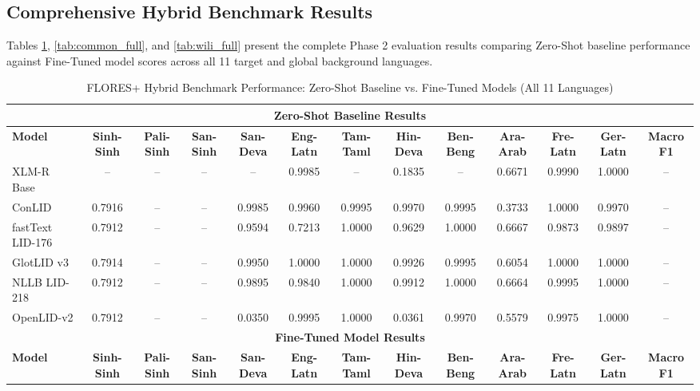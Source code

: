 \documentclass[conference]{IEEEtran}
\begin{document}
\subsection{Comprehensive Hybrid Benchmark Results}
Tables \ref{tab:flores_full}, \ref{tab:common_full}, and \ref{tab:wili_full} present the complete Phase 2 evaluation results comparing Zero-Shot baseline performance against Fine-Tuned model scores across all 11 target and global background languages.

\begin{table}[p]
\centering
\scriptsize
\setlength{\tabcolsep}{1.8pt}
\renewcommand{\arraystretch}{0.85}

\caption{FLORES+ Hybrid Benchmark Performance: Zero-Shot Baseline vs. Fine-Tuned Models (All 11 Languages)}
\label{tab:flores_full}
\begin{tabular}{l ccc cccccccc c}
\toprule
\multicolumn{13}{c}{\textbf{Zero-Shot Baseline Results}} \\
\midrule
\textbf{Model} & \textbf{Sinh-Sinh} & \textbf{Pali-Sinh} & \textbf{San-Sinh} & \textbf{San-Deva} & \textbf{Eng-Latn} & \textbf{Tam-Taml} & \textbf{Hin-Deva} & \textbf{Ben-Beng} & \textbf{Ara-Arab} & \textbf{Fre-Latn} & \textbf{Ger-Latn} & \textbf{Macro F1} \\
\midrule
XLM-R Base & -- & -- & -- & -- & 0.9985 & -- & 0.1835 & -- & 0.6671 & 0.9990 & 1.0000 & -- \\
ConLID & 0.7916 & -- & -- & 0.9985 & 0.9960 & 0.9995 & 0.9970 & 0.9995 & 0.3733 & 1.0000 & 0.9970 & -- \\
fastText LID-176 & 0.7912 & -- & -- & 0.9594 & 0.7213 & 1.0000 & 0.9629 & 1.0000 & 0.6667 & 0.9873 & 0.9897 & -- \\
GlotLID v3 & 0.7914 & -- & -- & 0.9950 & 1.0000 & 1.0000 & 0.9926 & 0.9995 & 0.6054 & 1.0000 & 1.0000 & -- \\
NLLB LID-218 & 0.7912 & -- & -- & 0.9895 & 0.9840 & 1.0000 & 0.9912 & 1.0000 & 0.6664 & 0.9995 & 1.0000 & -- \\
OpenLID-v2 & 0.7912 & -- & -- & 0.0350 & 0.9995 & 1.0000 & 0.0361 & 0.9970 & 0.5579 & 0.9975 & 1.0000 & -- \\
\midrule
\multicolumn{13}{c}{\textbf{Fine-Tuned Model Results}} \\
\midrule
\textbf{Model} & \textbf{Sinh-Sinh} & \textbf{Pali-Sinh} & \textbf{San-Sinh} & \textbf{San-Deva} & \textbf{Eng-Latn} & \textbf{Tam-Taml} & \textbf{Hin-Deva} & \textbf{Ben-Beng} & \textbf{Ara-Arab} & \textbf{Fre-Latn} & \textbf{Ger-Latn} & \textbf{Macro F1} \\

\end{tabular}
\end{table}
\end{document}

